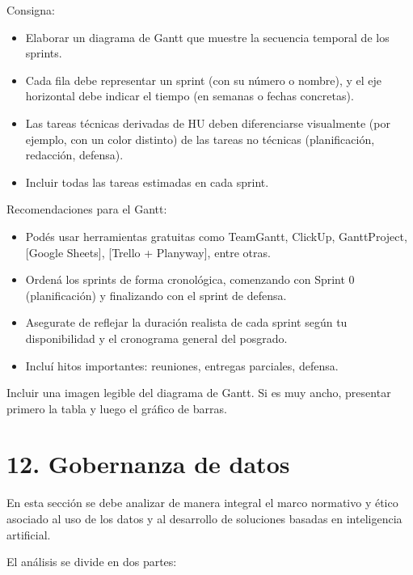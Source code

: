 \documentclass[
11pt, %
codirector, %
]{charter}
\begin{document}
Consigna:

\begin{itemize}

\item Elaborar un diagrama de Gantt que muestre la secuencia temporal de los sprints.

\item Cada fila debe representar un sprint (con su número o nombre), y el eje horizontal debe indicar el tiempo (en semanas o fechas concretas).

\item Las tareas técnicas derivadas de HU deben diferenciarse visualmente (por ejemplo, con un color distinto) de las tareas no técnicas (planificación, redacción, defensa).

\item Incluir todas las tareas estimadas en cada sprint.
\end{itemize}

Recomendaciones para el Gantt:

\begin{itemize}

	\item Podés usar herramientas gratuitas como TeamGantt, ClickUp, GanttProject, [Google Sheets], [Trello + Planyway], entre otras.
	\item Ordená los sprints de forma cronológica, comenzando con Sprint 0 (planificación) y finalizando con el sprint de defensa.
	\item Asegurate de reflejar la duración realista de cada sprint según tu disponibilidad y el cronograma general del posgrado.
	\item Incluí hitos importantes: reuniones, entregas parciales, defensa.
\end{itemize}


Incluir una imagen legible del diagrama de Gantt. Si es muy ancho, presentar primero la tabla y luego el gráfico de barras.



\section{12. Gobernanza de datos}
\label{sec:gobernanza}

En esta sección se debe analizar de manera integral el marco normativo y ético asociado al uso de los datos y al desarrollo de soluciones basadas en inteligencia artificial.

El análisis se divide en dos partes:
\end{document}
